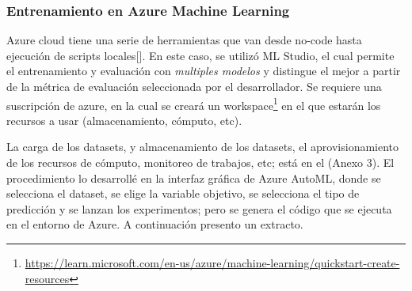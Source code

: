 \subsubsection{Entrenamiento en Azure Machine
Learning}\label{entrenamiento-en-azure-machine-learning}

Azure cloud tiene una serie de herramientas que van desde no-code hasta
ejecución de scripts locales{[}{]}. En este caso, se utilizó ML Studio,
el cual permite el entrenamiento y evaluación con \emph{multiples
modelos} y distingue el mejor a partir de la métrica de evaluación
seleccionada por el desarrollador. Se requiere una suscripción de azure,
en la cual se creará un workspace\footnote{\url{https://learn.microsoft.com/en-us/azure/machine-learning/quickstart-create-resources}}
en el que estarán los recursos a usar (almacenamiento, cómputo, etc).

La carga de los datasets, y almacenamiento de los datasets, el
aprovisionamiento de los recursos de cómputo, monitoreo de trabajos,
etc; está en el (Anexo 3). El procedimiento lo desarrollé en la interfaz
gráfica de Azure AutoML, donde se selecciona el dataset, se elige la
variable objetivo, se selecciona el tipo de predicción y se lanzan los
experimentos; pero se genera el código que se ejecuta en el entorno de
Azure. A continuación presento un extracto.

